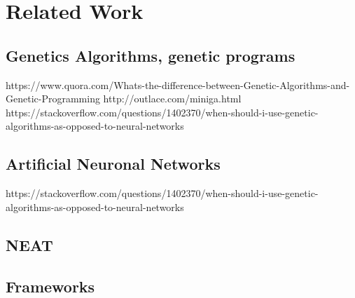 %
\chapter{Related Work}
\label{sec:related}


\section{Genetics Algorithms, genetic programs}
\label{sec:related:genetic}

https://www.quora.com/Whats-the-difference-between-Genetic-Algorithms-and-Genetic-Programming
http://outlace.com/miniga.html
https://stackoverflow.com/questions/1402370/when-should-i-use-genetic-algorithms-as-opposed-to-neural-networks

\section{Artificial Neuronal Networks}
\label{sec:related:nn}

https://stackoverflow.com/questions/1402370/when-should-i-use-genetic-algorithms-as-opposed-to-neural-networks

\section{NEAT}
\label{sec:related:neat}

\section{Frameworks}
\label{sec:related:framework}
